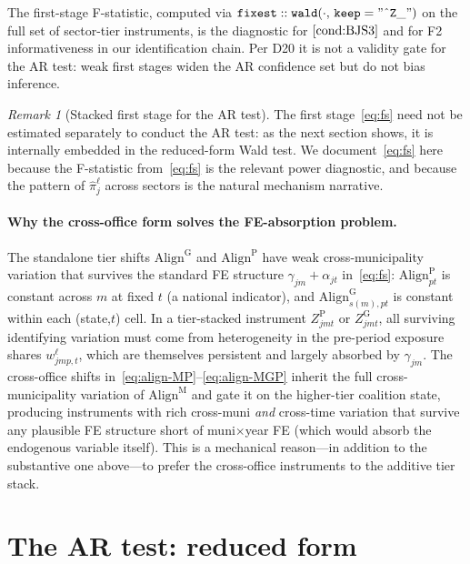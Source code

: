 \documentclass{article}
\newcommand{\Align}{\mathrm{Align}}
\theoremstyle{plain}
\theoremstyle{definition}
\theoremstyle{remark}
\newtheorem{remark}{Remark}
\begin{document}
The first-stage F-statistic, computed via
$\mathtt{fixest::wald(\cdot,\,keep="\char`\^Z\_")}$ on the full set of
sector-tier instruments, is the diagnostic for $\autoref{cond:BJS3}$ and for
F2 informativeness in our identification chain. Per D20 it is not a validity
gate for the AR test: weak first stages widen the AR confidence set but do
not bias inference.

\begin{remark}[Stacked first stage for the AR test]
The first stage~\eqref{eq:fs} need not be estimated separately to conduct the
AR test: as the next section shows, it is internally embedded in the
reduced-form Wald test. We document~\eqref{eq:fs} here because the F-statistic
from~\eqref{eq:fs} is the relevant power diagnostic, and because the pattern
of $\hat\pi^{\ell}_j$ across sectors is the natural mechanism narrative.
\end{remark}

\paragraph{Why the cross-office form solves the FE-absorption problem.}
The standalone tier shifts $\Align^{\mathrm{G}}$ and $\Align^{\mathrm{P}}$
have weak cross-municipality variation that survives the standard FE
structure $\gamma_{jm}+\alpha_{jt}$ in~\eqref{eq:fs}: $\Align^{\mathrm{P}}_{pt}$
is constant across $m$ at fixed $t$ (a national indicator), and
$\Align^{\mathrm{G}}_{s(m),pt}$ is constant within each (state,$t$) cell.
In a tier-stacked instrument $Z^{\mathrm{P}}_{jmt}$ or
$Z^{\mathrm{G}}_{jmt}$, all surviving identifying variation must come from
heterogeneity in the pre-period exposure shares $w^{\ell}_{jmp,t}$, which
are themselves persistent and largely absorbed by $\gamma_{jm}$. The
cross-office shifts in~\eqref{eq:align-MP}--\eqref{eq:align-MGP} inherit the
full cross-municipality variation of $\Align^{\mathrm{M}}$ and gate it on
the higher-tier coalition state, producing instruments with rich
cross-muni \emph{and} cross-time variation that survive any plausible FE
structure short of muni$\times$year FE (which would absorb the endogenous
variable itself). This is a mechanical reason---in addition to the
substantive one above---to prefer the cross-office instruments to the
additive tier stack.

\section{The AR test: reduced form}\label{sec:ar}
\end{document}
